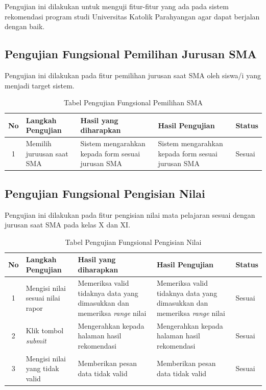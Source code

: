 Pengujian ini dilakukan untuk menguji fitur-fitur yang ada pada sistem rekomendasi program studi Universitas Katolik Parahyangan agar dapat berjalan dengan baik.

\subsection{Pengujian Fungsional Pemilihan Jurusan SMA}
\label{subsec:pengujian fungsional pemilihan jurusan}

Pengujian ini dilakukan pada fitur pemilihan jurusan saat SMA oleh siswa/i yang menjadi target sistem.

\begin{table}[H]
    \centering
    \begin{tabular}{|c|p{3.5cm}|p{3.5cm}|p{3.5cm}|p{1.5cm}|}
        \hline
        No & Langkah Pengujian & Hasil yang diharapkan & Hasil Pengujian & Status \\
        \hline
        1 & Memilih juruusan saat SMA & Sistem mengarahkan kepada form sesuai jurusan SMA & Sistem mengarahkan kepada form sesuai jurusan SMA & Sesuai\\
        \hline
    \end{tabular}
    \caption{Tabel Pengujian Fungsional Pemilihan SMA}
    \label{tab:tabel pengujian fungsional pemilihan SMA}
\end{table}

\subsection{Pengujian Fungsional Pengisian Nilai}
\label{subsec:pengujian fungsional pengisian nilai}

Pengujian ini dilakukan pada fitur pengisian nilai mata pelajaran sesuai dengan jurusan saat SMA pada kelas X dan XI. 

\begin{table}[H]
    \centering
    \begin{tabular}{|c|p{3.5cm}|p{3.5cm}|p{3.5cm}|p{1.5cm}|}
        \hline
        No & Langkah Pengujian & Hasil yang diharapkan & Hasil Pengujian & Status \\
        \hline
        1 & Mengisi nilai sesuai nilai rapor & Memeriksa valid tidaknya data yang dimasukkan dan memeriksa \textit{range} nilai & Memeriksa valid tidaknya data yang dimasukkan dan memeriksa \textit{range} nilai & Sesuai \\
        \hline
        2 & Klik tombol \textit{submit} & Mengerahkan kepada halaman hasil rekomendasi & Mengerahkan kepada halaman hasil rekomendasi & Sesuai \\
        \hline
        3 & Mengisi nilai yang tidak valid & Memberikan pesan data tidak valid & Memberikan pesan data tidak valid & Sesuai\\
        \hline
    \end{tabular}
    \caption{Tabel Pengujian Fungsional Pengisian Nilai}
    \label{tab:tabel pengujian fungsional pengisian nilai}
\end{table}


